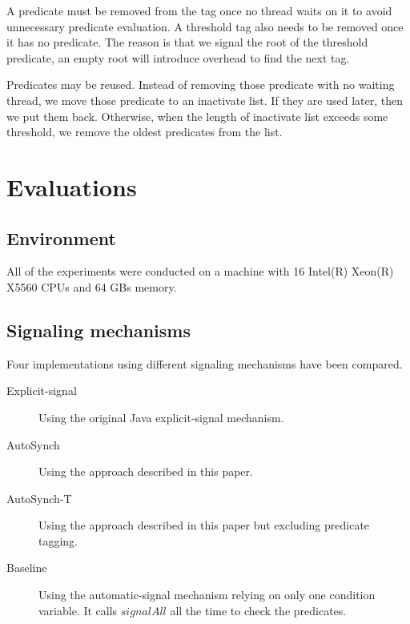 \documentclass[preprint]{sigplanconf}
\begin{document}
A predicate must be removed from the tag once no thread waits on 
it to avoid unnecessary predicate evaluation. A threshold tag also needs to be
removed once it has no predicate. The reason is that 
we signal the root of the threshold predicate, an empty root 
will introduce overhead to find the next tag. 

Predicates may be reused. Instead  of removing those predicate with no waiting
thread, 
we move those predicate to an inactivate list. If they are used later, then we 
put them back. Otherwise, when the length of inactivate list exceeds some 
threshold, we remove the oldest predicates from the list.


\section{Evaluations} \label{sec:eval}
\subsection{Environment}
All of the experiments were conducted on a machine with 16 
Intel(R) Xeon(R) X5560 CPUs and 64 GBs memory. 


\subsection{Signaling mechanisms}
Four implementations using different signaling mechanisms have been 
compared. 
\begin{description}
    \item[Explicit-signal] Using the original Java explicit-signal mechanism. 
    \item[AutoSynch] Using the approach described in this paper. 
    \item[AutoSynch-T] Using the approach described in this paper but excluding
        predicate tagging. 
    \item[Baseline] Using the automatic-signal mechanism relying on only
        one condition variable. It calls $signalAll$ all the time to check the
        predicates.
\end{description}
\end{document}
